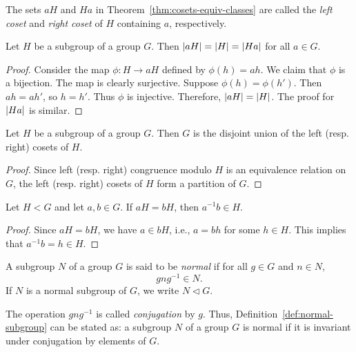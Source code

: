 \begin{definition}
    The sets \(aH\) and \(Ha\) in Theorem~\ref{thm:cosets-equiv-classes} are called the \emph{left coset} and \emph{right coset} of \(H\) containing \(a\), respectively.
\end{definition}

\begin{theorem}
    Let \(H\) be a subgroup of a group \(G\). Then \(\lvert aH \rvert = \lvert H \rvert = \lvert Ha \rvert\) for all \(a \in G\).
\end{theorem}

\begin{proof}
    Consider the map \(\phi: H \to aH\) defined by \(\phi(h) = ah\). We claim that \(\phi\) is a bijection. The map is clearly surjective. Suppose \(\phi(h) = \phi(h')\). Then \(ah = ah'\), so \(h = h'\). Thus \(\phi\) is injective. Therefore, \(\lvert aH \rvert = \lvert H \rvert\). The proof for \(\lvert Ha \rvert\) is similar.
\end{proof}

\begin{theorem}
    Let \(H\) be a subgroup of a group \(G\). Then \(G\) is the disjoint union of the left (resp. right) cosets of \(H\).
\end{theorem}

\begin{proof}
    Since left (resp. right) congruence modulo \(H\) is an equivalence relation on \(G\), the left (resp. right) cosets of \(H\) form a partition of \(G\).
\end{proof}


\begin{theorem}
    Let \(H < G\) and let \(a, b \in G\). If \(aH = bH\), then \(a^{-1}b \in H\).
\end{theorem}

\begin{proof}
    Since \(aH = bH\), we have \(a \in bH\), i.e., \(a = bh\) for some \(h \in H\). This implies that \(a^{-1}b = h \in H\).
\end{proof}

\begin{definition}
    \label{def:normal-subgroup}
    A subgroup \(N\) of a group \(G\) is said to be \emph{normal} if for all \(g \in G\) and \(n \in N\),
    \[
        gng^{-1} \in N.
    \]
    If \(N\) is a normal subgroup of \(G\), we write \(N \triangleleft G\).
\end{definition}

\begin{remark}
    The operation \(gng^{-1}\) is called \emph{conjugation} by \(g\). Thus, Definition~\ref{def:normal-subgroup} can be stated as: a subgroup \(N\) of a group \(G\) is normal if it is invariant under conjugation by elements of \(G\).
\end{remark}

